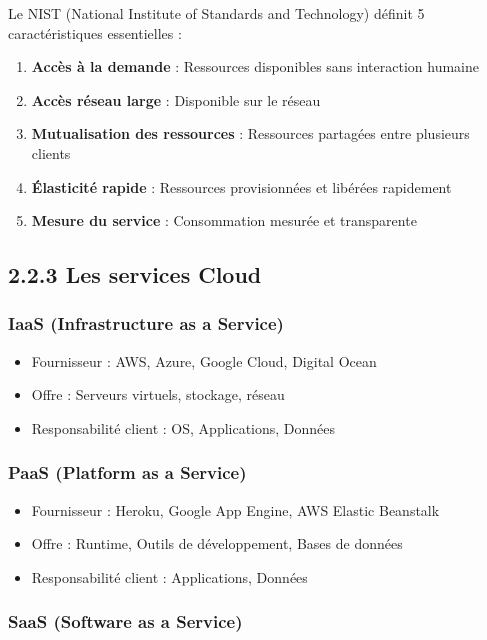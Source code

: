 \documentclass[12pt,a4paper]{report}
\begin{document}
Le NIST (National Institute of Standards and Technology) définit 5 caractéristiques essentielles :

\begin{enumerate}
    \item \textbf{Accès à la demande} : Ressources disponibles sans interaction humaine
    \item \textbf{Accès réseau large} : Disponible sur le réseau
    \item \textbf{Mutualisation des ressources} : Ressources partagées entre plusieurs clients
    \item \textbf{Élasticité rapide} : Ressources provisionnées et libérées rapidement
    \item \textbf{Mesure du service} : Consommation mesurée et transparente
\end{enumerate}

\subsection{2.2.3 Les services Cloud}

\subsubsection{IaaS (Infrastructure as a Service)}

\begin{itemize}
    \item Fournisseur : AWS, Azure, Google Cloud, Digital Ocean
    \item Offre : Serveurs virtuels, stockage, réseau
    \item Responsabilité client : OS, Applications, Données
\end{itemize}

\subsubsection{PaaS (Platform as a Service)}

\begin{itemize}
    \item Fournisseur : Heroku, Google App Engine, AWS Elastic Beanstalk
    \item Offre : Runtime, Outils de développement, Bases de données
    \item Responsabilité client : Applications, Données
\end{itemize}

\subsubsection{SaaS (Software as a Service)}
\end{document}
